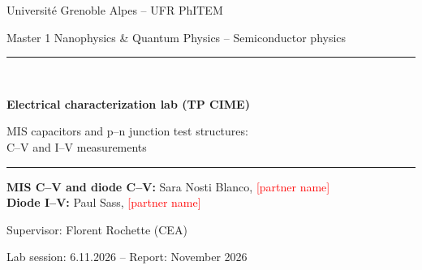\documentclass[11pt,a4paper]{article}
\newcommand{\tocheck}[1]{\textcolor{red}{[#1]}}
\begin{document}
\begin{titlepage}
  \centering
  \vspace*{1.5cm}
  {\large Université Grenoble Alpes -- UFR PhITEM\par}
  {\large Master 1 Nanophysics \& Quantum Physics -- Semiconductor physics\par}
  \vspace{2.5cm}
  \rule{\linewidth}{0.6pt}\\[0.4cm]
  {\LARGE\bfseries Electrical characterization lab (TP CIME)\par}
  \vspace{0.3cm}
  {\Large MIS capacitors and p--n junction test structures:\\ C--V and I--V measurements\par}
  \rule{\linewidth}{0.6pt}
  \vspace{2.5cm}

  {\large
  \textbf{MIS C--V and diode C--V:} Sara Nosti Blanco, \tocheck{partner name}\\[0.2cm]
  \textbf{Diode I--V:} Paul Sass, \tocheck{partner name}}\par
  \vspace{1.5cm}
  {\large Supervisor: Florent Rochette (CEA)\par}
  \vfill
  {\large Lab session: 6.11.2026 \quad -- \quad Report: November 2026\par}
\end{titlepage}





\end{document}
